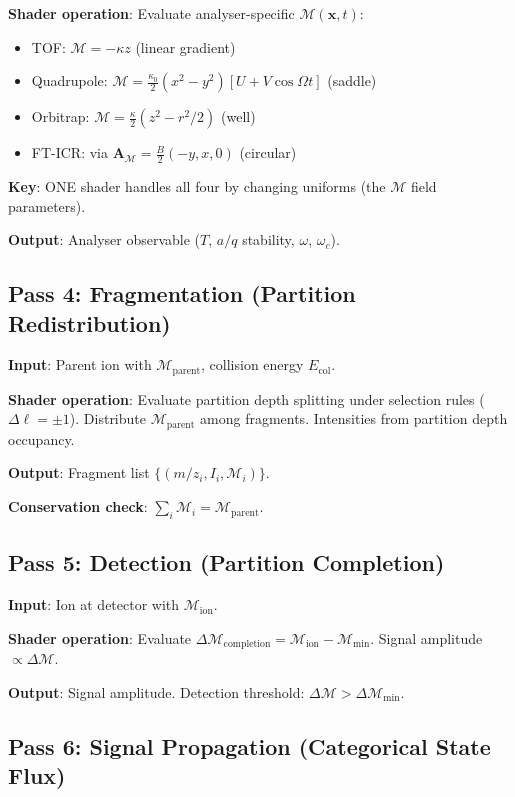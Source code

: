\documentclass[11pt,twocolumn,a4paper]{article}
\theoremstyle{definition}
\theoremstyle{remark}
\newcommand{\Depth}{\mathcal{M}}
\newcommand{\Apartition}{\mathbf{A}_{\mathcal{M}}}
\begin{document}
\textbf{Shader operation}: Evaluate analyser-specific $\Depth(\mathbf{x},t)$:
\begin{itemize}[nosep]
\item TOF: $\Depth = -\kappa z$ (linear gradient)
\item Quadrupole: $\Depth = \frac{\kappa_0}{2}(x^2-y^2)[U + V\cos\Omega t]$ (saddle)
\item Orbitrap: $\Depth = \frac{\kappa}{2}(z^2 - r^2/2)$ (well)
\item FT-ICR: via $\Apartition = \frac{B}{2}(-y,x,0)$ (circular)
\end{itemize}

\textbf{Key}: ONE shader handles all four by changing uniforms (the $\Depth$ field parameters).

\textbf{Output}: Analyser observable ($T$, $a/q$ stability, $\omega$, $\omega_c$).

\subsection{Pass 4: Fragmentation (Partition Redistribution)}

\textbf{Input}: Parent ion with $\Depth_{\mathrm{parent}}$, collision energy $E_{\mathrm{col}}$.

\textbf{Shader operation}: Evaluate partition depth splitting under selection rules ($\Delta\ell = \pm 1$). Distribute $\Depth_{\mathrm{parent}}$ among fragments. Intensities from partition depth occupancy.

\textbf{Output}: Fragment list $\{(m/z_i, I_i, \Depth_i)\}$.

\textbf{Conservation check}: $\sum_i \Depth_i = \Depth_{\mathrm{parent}}$.

\subsection{Pass 5: Detection (Partition Completion)}

\textbf{Input}: Ion at detector with $\Depth_{\mathrm{ion}}$.

\textbf{Shader operation}: Evaluate $\Delta\Depth_{\mathrm{completion}} = \Depth_{\mathrm{ion}} - \Depth_{\min}$. Signal amplitude $\propto \Delta\Depth$.

\textbf{Output}: Signal amplitude. Detection threshold: $\Delta\Depth > \Delta\Depth_{\min}$.

\subsection{Pass 6: Signal Propagation (Categorical State Flux)}
\end{document}
